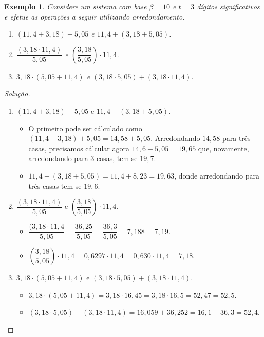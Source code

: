 \documentclass[
	12pt,				%
	openright,			%
	twoside,			%
	a4paper,			%
	english,			%
	french,				%
	brazil,				%
	sumario=tradicional
]{abntex2}
\newtheorem{example}{Exemplo}
\newenvironment{solution}{
	\begin{proof}[Solução]
}{\end{proof}}
\numberwithin{example}{chapter}
\numberwithin{remark}{chapter}
\numberwithin{definition}{chapter}
\numberwithin{figure}{chapter}
\begin{document}
\begin{example}
	\label{exemplo:ex_anterior}
    Considere um sistema com base $\beta = 10$ e $t=3$ dígitos significativos e efetue as operações a seguir utilizando arredondamento.
    \begin{enumerate}
        \item $(11,4+3,18)+5,05$ e $11,4+(3,18+5,05)$.
        \item $\dfrac{(3,18\cdot 11,4)}{5,05}$ e $\left ( \dfrac{3,18}{5,05} \right) \cdot 11,4$.
        \item $3,18\cdot (5,05+11,4)$ e $(3,18\cdot 5,05)+(3,18\cdot 11,4)$.
    \end{enumerate}
\end{example}
\begin{solution}\hfill
    \begin{enumerate}
        \item $(11,4+3,18)+5,05$ e $11,4+(3,18+5,05)$.
        	\begin{itemize}
        		\item O primeiro pode ser cálculado como $(11,4+3,18)+5,05=14,58+5,05$. Arredondando $14,58$ para três casas, precisamos cálcular agora $14,6+5,05=19,65$ que, novamente, arredondando para 3 casas, tem-se $19,7$.

        		\item $11,4+(3,18+5,05)=11,4+8,23=19,63$, donde arredondando para três casas tem-se $19,6$.
        	\end{itemize}
        	
        \item $\dfrac{(3,18\cdot 11,4)}{5,05}$ e $\left ( \dfrac{3,18}{5,05} \right) \cdot 11,4$.
        	\begin{itemize}
        		\item $\dfrac{(3,18\cdot 11,4}{5,05}=\dfrac{36,25}{5,05}=\dfrac{36,3}{5,05}=7,188=7,19$.
        		
        		\item $\left ( \dfrac{3,18}{5,05} \right )\cdot 11,4 =0,6297\cdot 11,4=0,630\cdot 11,4=7,18$.
        	\end{itemize}

        \item $3,18\cdot (5,05+11,4)$ e $(3,18\cdot 5,05)+(3,18\cdot 11,4)$.
        	\begin{itemize}
        		\item $3,18\cdot (5,05+11,4)=3,18\cdot 16,45=3,18\cdot 16,5=52,47=52,5$.
        		
        		\item $(3,18\cdot 5,05)+(3,18\cdot 11,4)=16,059+36,252=16,1+36,3=52,4$.
        	\end{itemize}
    \end{enumerate}
\end{solution}
\end{document}
